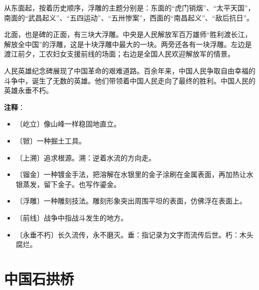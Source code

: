 \documentclass[12pt,UTF-8,openany]{ctexbook}
\begin{document}
\begin{large}
    从东面起，按着历史顺序，浮雕的主题分别是：东面的“虎门销烟”、“太平天国”，南面的“武昌起义”、“五四运动”、“五卅惨案”，西面的“南昌起义”、“敌后抗日”。
    
    北面，也是碑的正面，有三块大浮雕。中央是人民解放军百万雄师“胜利渡长江，解放全中国”的浮雕，这是十块浮雕中最大的一块。两旁还各有一块浮雕。左边是渡江前夕，工农妇女支援前线的场面；右边是全国人民欢迎解放军的情景。
    
    人民英雄纪念碑展现了中国革命的艰难道路。百余年来，中国人民争取自由幸福的斗争中，诞生了无数的英雄。他们带领着中国人民走向了最终的胜利。中国人民的英雄永垂不朽。
    
\end{large}


\newpage

\textbf{注释}：

\vspace{-1em}

\begin{itemize}
    \setlength\itemsep{-0.2em}
    \item 〔屹立〕像山峰一样稳固地直立。
    \item 〔锨〕一种掘土工具。
    \item 〔上溯〕追求根源。溯：逆着水流的方向走。
    \item 〔镏金〕一种镀金手法，把溶解在水银里的金子涂刷在金属表面，再加热让水银蒸发，留下金子。也写作鎏金。
    \item 〔浮雕〕一种雕刻技法。雕刻形象突出周围平坦的表面，仿佛浮在表面上。
    \item 〔前线〕战争中指战斗发生的地方。
    \item 〔永垂不朽〕长久流传，永不磨灭。垂：指记录为文字而流传后世。朽：木头腐烂。
\end{itemize}

\chapter{中国石拱桥}
\end{document}
